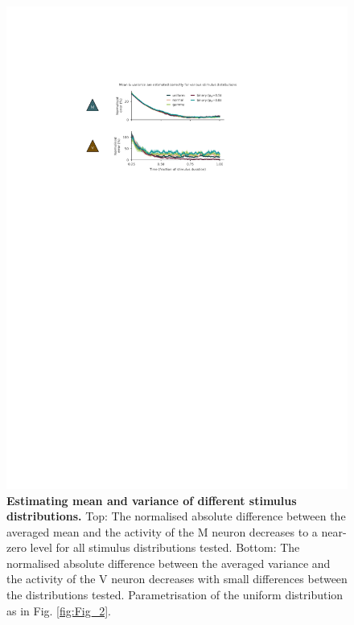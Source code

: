 \documentclass[10pt,a4paper,draft]{article}
\begin{document}
\begin{figure}[!h]
	\centering
    \includegraphics{../results/figures/final/Fig_2_S1.pdf}%
\caption{\footnotesize{\bf Estimating mean and variance of different stimulus distributions.\newline}  
Top: The normalised absolute difference between the averaged mean and the activity of the M neuron decreases to a near-zero level for all stimulus distributions tested. 
Bottom: The normalised absolute difference between the averaged variance and the activity of the V neuron decreases with small differences between the distributions tested. Parametrisation of the uniform distribution as in Fig. \ref{fig:Fig_2}. 
}
\label{fig:Fig_2_S1}
\end{figure}
\end{document}
